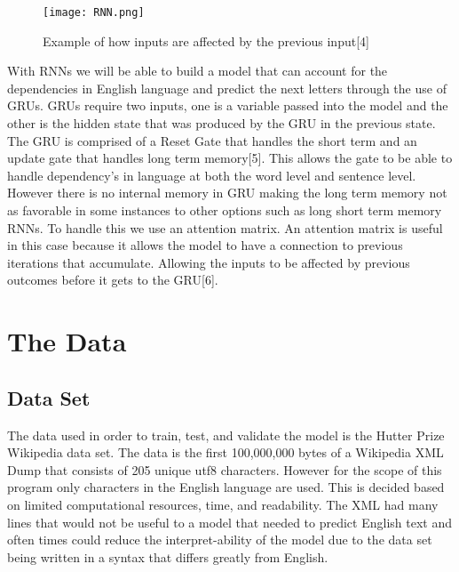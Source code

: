 \documentclass[conference]{IEEEtran}
\begin{document}
\begin{figure}[htbp]
\centerline{\texttt{[image: RNN.png]}}
\caption{Example of how inputs are affected by the previous input[4]}
\label{fig1}
\end{figure}

With RNNs we will be able to build a model that can account for the dependencies in English language and predict the next letters through the use of GRUs. GRUs require two inputs, one is a variable passed into the model and the other is the hidden state that was produced by the GRU in the previous state. The GRU is comprised of a Reset Gate that handles the short term and an update gate that handles long term memory[5]. This allows the gate to be able to handle dependency's in language at both the word level and sentence level. However there is no internal memory in GRU making the long term memory not as favorable in some instances to other options such as long short term memory RNNs. To handle this we use an attention matrix. An attention matrix is useful in this case because it allows the model to have a connection to previous iterations that accumulate. Allowing the inputs to be affected by previous outcomes before it gets to the GRU[6].

\section{The Data}

\subsection{Data Set}
The data used in order to train, test, and validate the model is the Hutter Prize Wikipedia data set. The data is the first 100,000,000 bytes of a Wikipedia XML Dump that consists of 205 unique utf8 characters. However for the scope of this program only characters in the English language are used. This is decided based on limited computational resources, time, and readability. The XML had many lines that would not be useful to a model that needed to predict English text and often times could reduce the interpret-ability of the model due to the data set being written in a syntax that differs greatly from English. 
\end{document}
